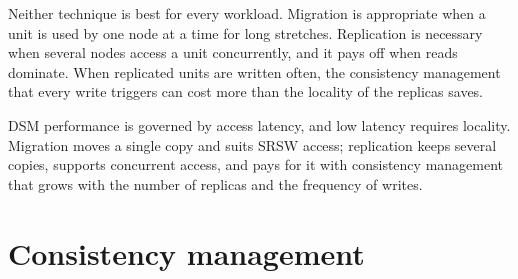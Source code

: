 \documentclass[../main.tex]{subfiles}
\begin{document}
Neither technique is best for every workload.  Migration is appropriate
when a unit is used by one node at a time for long stretches.  Replication
is necessary when several nodes access a unit concurrently, and it pays off
when reads dominate.  When replicated units
are written often, the consistency management that every write triggers can
cost more than the locality of the replicas saves.

\begin{keypoint}
  DSM performance is governed by access latency, and low latency requires
  locality.  Migration moves a single copy and suits SRSW access;
  replication keeps several copies, supports concurrent access, and pays
  for it with consistency management that grows with the number of
  replicas and the frequency of writes.
\end{keypoint}

\section{Consistency management}
\label{sec:l15-management}
\end{document}
